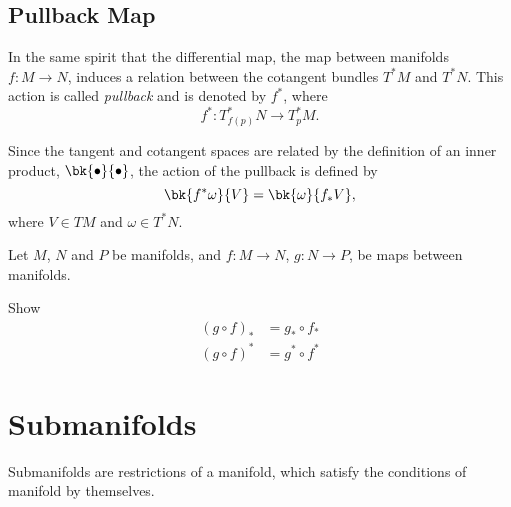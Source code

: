 \subsection{Pullback Map}

In the same spirit that the differential map, the map between manifolds $f:M\to N$, induces a relation between the cotangent bundles $T^*M$ and $T^*N$. This action is called \emph{pullback} and is denoted by $f^*$, where
\begin{equation}
  f^*: T^*_{f(p)}N \to T^*_p M.
\end{equation}

Since the tangent and cotangent spaces are related by the definition of an inner product, $\bk{\bullet}{\bullet}$, the action of the pullback is defined by 
\begin{equation}
  \bk{f^*\omega}{V} = \bk{\omega}{f_*V},
\end{equation}
where $V \in TM$ and $\omega \in T^*N$.

\begin{Ebox}
  Let $M$, $N$ and $P$ be manifolds, and $ f:M\to N$, $g:N\to P$,  be maps between manifolds. 

  Show
  \begin{align*}
    (g\circ f)_* &= g_*\circ f_*\\
    (g\circ f)^* &= g^*\circ f^*
  \end{align*}
\end{Ebox}

\section{Submanifolds}

Submanifolds are restrictions of a manifold, which satisfy the conditions of manifold by themselves.

\begin{center}
\end{center}

